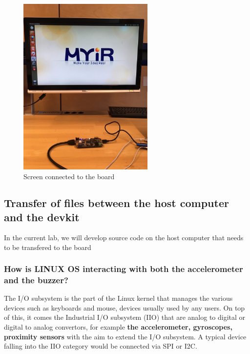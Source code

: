\begin{figure}[h!]
    \centering
    \includegraphics[width=0.6\textwidth]{img/hdmi.JPG}
    \caption{Screen connected to the board}
    \label{fig:hdmi}
\end{figure}


\clearpage
\subsection{Transfer of files between the host computer and the devkit}

In the current lab, we will develop source code on the host computer that needs to be transfered to the board








\subsubsection{How is LINUX OS interacting with both the accelerometer and the buzzer?}

The I/O subsystem is the part of the Linux kernel that manages the various devices such as keyboards and mouse, devices usually used by any users. On top of this, it comes the Industrial I/O subsystem (IIO) that are analog to digital or digital to analog convertors, for example \textbf{the accelerometer, gyroscopes, proximity sensors} with the aim to extend the I/O subsystem. A typical device falling into the IIO category would be connected via SPI or I2C.




